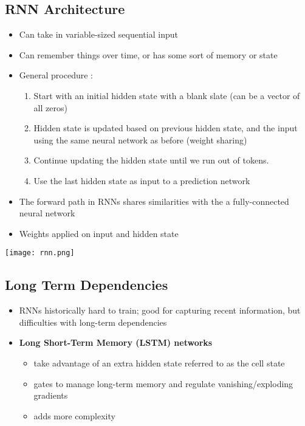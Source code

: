 \documentclass[11pt]{article}
\begin{document}
\subsection{RNN Architecture}
\begin{itemize}
\item Can take in variable-sized sequential input 
\item Can remember things over time, or has some sort of memory or state
\item General procedure :
\begin{enumerate}
\item Start with an initial hidden state with a blank slate (can be a vector of all zeros) 
\item Hidden state is updated based on previous hidden state, and the input using the same neural network as before (weight sharing)
\item Continue updating the hidden state until we run out of tokens.
\item Use the last hidden state as input to a prediction network
\end{enumerate}
\item The forward path in RNNs shares similarities with the a fully-connected neural network
\item Weights applied on input and hidden state
\end{itemize}

\begin{center}
\texttt{[image: rnn.png]}
\end{center}

\subsection{Long Term Dependencies}
\begin{itemize}
\item RNNs historically hard to train; good for capturing recent information, but difficulties with long-term dependencies
\item \textbf{Long Short-Term Memory (LSTM) networks}
\begin{itemize}
\item take advantage of an extra hidden state referred to as the cell state
\item gates to manage long-term memory and regulate vanishing/exploding gradients
\item adds more complexity
\end{itemize}
\end{itemize}
\end{document}
